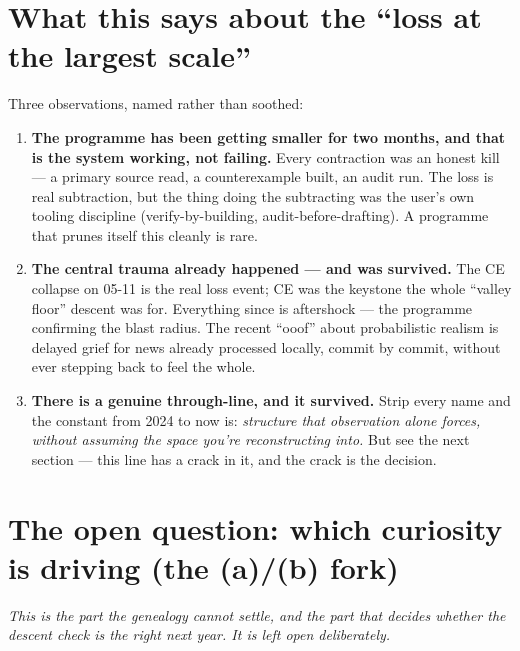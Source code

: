\documentclass[11pt]{article}
\begin{document}
\section{What this says about the ``loss at the largest scale''}

Three observations, named rather than soothed:

\begin{enumerate}[leftmargin=2em]
\item \textbf{The programme has been getting smaller for two months, and that is
the system working, not failing.} Every contraction was an honest kill --- a
primary source read, a counterexample built, an audit run. The loss is real
subtraction, but the thing doing the subtracting was the user's own tooling
discipline (verify-by-building, audit-before-drafting). A programme that prunes
itself this cleanly is rare.

\item \textbf{The central trauma already happened --- and was survived.} The CE
collapse on 05-11 is the real loss event; CE was the keystone the whole ``valley
floor'' descent was for. Everything since is aftershock --- the programme
confirming the blast radius. The recent ``ooof'' about probabilistic realism is
delayed grief for news already processed locally, commit by commit, without ever
stepping back to feel the whole.

\item \textbf{There is a genuine through-line, and it survived.} Strip every name
and the constant from 2024 to now is: \emph{structure that observation alone
forces, without assuming the space you're reconstructing into.} But see the next
section --- this line has a crack in it, and the crack is the decision.
\end{enumerate}

\section{The open question: which curiosity is driving (the (a)/(b) fork)}

\noindent
\emph{This is the part the genealogy cannot settle, and the part that decides
whether the descent check is the right next year. It is left open deliberately.}
\end{document}
